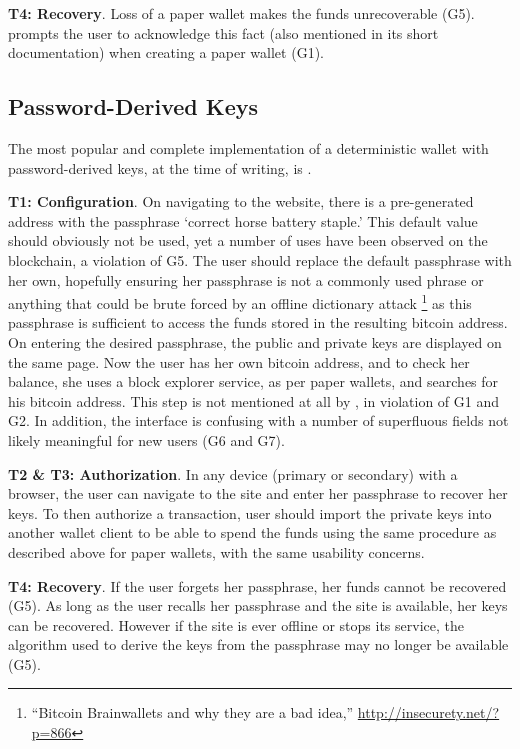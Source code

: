 \textbf{T4: Recovery}.
Loss of a paper wallet makes the funds unrecoverable (G5). \paper prompts the user to acknowledge this fact (also mentioned in its short documentation) when creating a paper wallet (G1).

\subsection{Password-Derived Keys} The most popular and complete implementation of a deterministic wallet with password-derived keys, at the time of writing, is \brain.

\textbf{T1: Configuration}.
On navigating to the \brain website, there is a pre-generated address with the passphrase `correct horse battery staple.' This default value should obviously not be used, yet a number of uses have been observed on the blockchain, a violation of G5. The user should replace the default passphrase with her own, hopefully ensuring her passphrase is not a commonly used phrase or anything that could be brute forced by an offline dictionary attack \footnote{``Bitcoin Brainwallets and why they are a bad idea,'' \url{http://insecurety.net/?p=866}} as this passphrase is sufficient to access the funds stored in the resulting bitcoin address. On entering the desired passphrase, the public and private keys are displayed on the same page. Now the user has her own bitcoin address, and to check her balance, she uses  a block explorer service, as per paper wallets, and searches for his bitcoin address. This step is not mentioned at all by \brain, in violation of G1 and G2. In addition, the interface is confusing with a number of superfluous fields not likely meaningful for new users (G6 and G7).

\textbf{T2 \& T3: Authorization}.
In any device (primary or secondary) with a browser, the user can navigate to the \brain site and enter her passphrase to recover her keys. To then authorize a transaction, user should import the private keys into another wallet client to be able to spend the funds using the same procedure as described above for paper wallets, with the same usability concerns.

\textbf{T4: Recovery}.
If the user forgets her passphrase, her funds cannot be recovered (G5). As long as the user recalls her passphrase and the \brain site is available, her keys can be recovered. However if the site is ever offline or stops its service, the algorithm used to derive the keys from the passphrase may no longer be available (G5).

